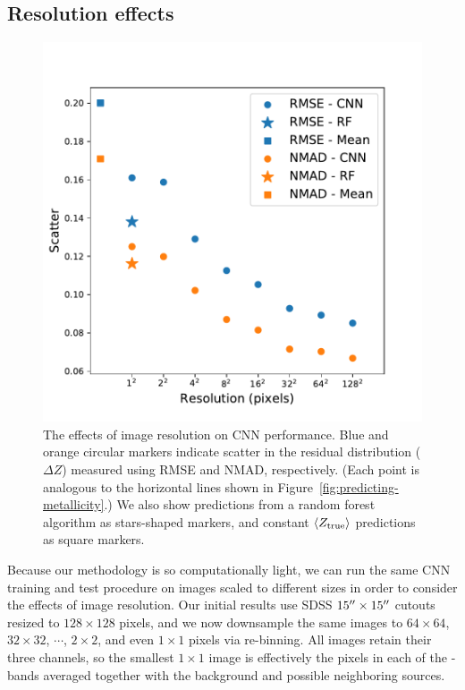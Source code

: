 \documentclass[fleqn,usenatbib]{mnras}
\begin{document}
\subsection{Resolution effects} \label{sec:resolution}

\begin{figure}
	\includegraphics[width=\columnwidth]{04-resolution.pdf}
	\caption{\label{fig:resolution}
		The effects of image resolution on CNN performance. Blue and orange circular markers indicate scatter in the residual distribution ($\Delta Z$) measured using RMSE and NMAD, respectively. (Each point is analogous to the horizontal lines shown in Figure~\ref{fig:predicting-metallicity}.) We also show predictions from a random forest algorithm as stars-shaped markers, and constant $\langle Z_{\rm true}\rangle$ predictions as square markers.}
\end{figure}

Because our methodology is so computationally light, we can run the same CNN training and test procedure on images scaled to different sizes in order to consider the effects of image resolution. Our initial results use SDSS $15\hbox{$^{\prime\prime}$} \times 15 \hbox{$^{\prime\prime}$}$ cutouts resized to $128\times 128$ pixels, and we now downsample the same images to $64\times 64$, $32 \times 32$, $\cdots$, $2\times 2$, and even $1\times 1$ pixels via re-binning. All images retain their three channels, so the smallest $1 \times 1$ image is effectively the pixels in each of the \sdssi\sdssr\sdssg-bands averaged together with the background and possible neighboring sources.
\end{document}
